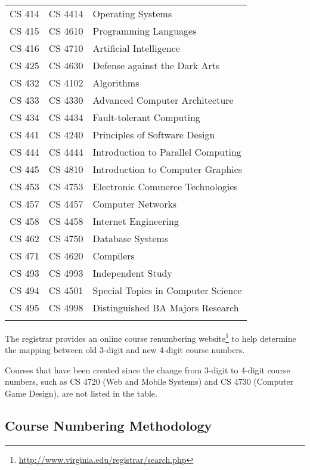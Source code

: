 \documentclass[10pt,letter]{book}
\newcommand{\myurl}[1]{\footnote{\scriptsize\url{#1}}}
\begin{document}
\begin{tabular}{llp{2.5in}}
CS 414 & CS 4414 & Operating Systems \\
CS 415 & CS 4610 & Programming Languages \\
CS 416 & CS 4710 & Artificial Intelligence \\
CS 425 & CS 4630 & Defense against the Dark Arts \\
CS 432 & CS 4102 & Algorithms \\
CS 433 & CS 4330 & Advanced Computer Architecture \\
CS 434 & CS 4434 & Fault-tolerant Computing \\
CS 441 & CS 4240 & Principles of Software Design \\
CS 444 & CS 4444 & Introduction to Parallel Computing \\
CS 445 & CS 4810 & Introduction to Computer Graphics \\
CS 453 & CS 4753 & Electronic Commerce Technologies \\
CS 457 & CS 4457 & Computer Networks \\
CS 458 & CS 4458 & Internet Engineering \\
CS 462 & CS 4750 & Database Systems \\
CS 471 & CS 4620 & Compilers \\
CS 493 & CS 4993 & Independent Study \\
CS 494 & CS 4501 & Special Topics in Computer Science \\
CS 495 & CS 4998 & Distinguished BA Majors Research \\ \hline
\\
\end{tabular}

The registrar provides an online course renumbering
website\myurl{http://www.virginia.edu/registrar/search.php}
to help determine the mapping between old 3-digit and new 4-digit
course numbers.

Courses that have been created since the change from 3-digit to
4-digit course numbers, such as CS 4720 (Web and Mobile Systems) and
CS 4730 (Computer Game Design), are not listed in the table.



\subsection{Course Numbering Methodology}
\end{document}
